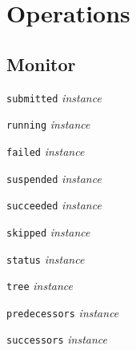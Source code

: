 \documentclass[a4paper,12pt,english,oneside]{book}
\begin{document}
\chapter{Operations}

\section{Monitor}

\begin{labeling}[\quad]{}
    \item[{\texttt{submitted} \emph{instance}}]\mbox{}\medskip\\
    \item[{\texttt{running} \emph{instance}}]\mbox{}\medskip\\
    \item[{\texttt{failed} \emph{instance}}]\mbox{}\medskip\\
    \item[{\texttt{suspended} \emph{instance}}]\mbox{}\medskip\\
    \item[{\texttt{succeeded} \emph{instance}}]\mbox{}\medskip\\
    \item[{\texttt{skipped} \emph{instance}}]\mbox{}\medskip\\
    \item[{\texttt{status} \emph{instance}}]\mbox{}\medskip\\
    \item[{\texttt{tree} \emph{instance}}]\mbox{}\medskip\\
    \item[{\texttt{predecessors} \emph{instance}}]\mbox{}\medskip\\
    \item[{\texttt{successors} \emph{instance}}]\mbox{}\medskip\\
\end{labeling}
\end{document}
